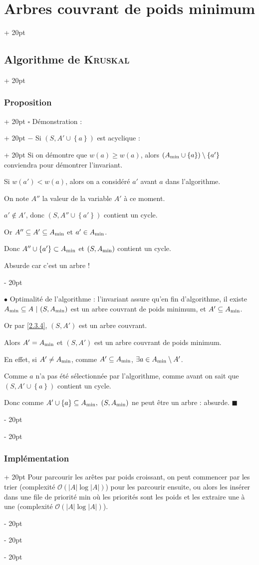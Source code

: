 \documentclass[a4paper, 12pt, twoside]{article}
\newcommand{\set}[1]{\left\{ #1 \right\}}
\newcommand{\abs}[1]{\left\lvert #1 \right\rvert}
\renewcommand{\ge}{\geqslant}
\newcommand{\ind}[1][20pt]{\advance\leftskip + #1}
\newcommand{\deind}[1][20pt]{\advance\leftskip - #1}
\newenvironment{indt}[2][20pt]{#2 \par \ind[#1]}{\par \deind} %
\newenvironment{proof}[1][{Démonstration :}]{\begin{indt}{$\square$ #1}}{$\blacksquare$ \end{indt}}
\begin{document}
\begin{indt}{\section{Arbres couvrant de poids minimum}}
\begin{indt}{\subsection{Algorithme de \textsc{Kruskal}}}
\begin{indt}{\subsubsection{Proposition}}
\begin{proof}
\begin{indt}{$-$ Si $(S, A' \cup \set a)$ est acyclique :}
                        Si on démontre que $w(a) \ge w(a)$, alors $(A_{\rm min} \cup \set a) \setminus \set{a'}$ conviendra pour démontrer l'invariant.

                        Si $w(a') < w(a)$, alors on a considéré $a'$ avant $a$ dans l'algorithme.

                        On note $A''$ la valeur de la variable $A'$ à ce moment.

                        $a' \notin A'$, donc $(S, A'' \cup \set {a'})$ contient un cycle.

                        Or $A'' \subseteq A' \subseteq A_{\rm min}$ et $a' \in A_{\rm min}$.

                        Donc $A'' \cup \set {a'} \subset A_{\rm min}$ et $(S, A_{\rm min})$ contient un cycle.

                        Absurde car c'est un arbre !
                    \end{indt}

                    \vspace{12pt}
                    
                    $\bullet$ Optimalité de l'algorithme : l'invariant assure qu'en fin d'algorithme, il existe $A_{\rm min} \subseteq A\ |\ (S, A_{\rm min})$ est un arbre couvrant de poids minimum, et $A' \subseteq A_{\rm min}$.

                    Or par \ref{2.3.4}, $(S, A')$ est un arbre couvrant.

                    Alors $A' = A_{\rm min}$ et $(S, A')$ est un arbre couvrant de poids minimum.

                    En effet, si $A' \neq A_{\rm min}$, comme $A' \subseteq A_{\rm min}$, $\exists a \in A_{\rm min} \setminus A'$.

                    Comme $a$ n'a pas été sélectionnée par l'algorithme, comme avant on sait que $(S, A' \cup \set a)$ contient un cycle.

                    Donc comme $A' \cup \set a \subseteq A_{\rm min},\ (S, A_{\rm min})$ ne peut être un arbre : absurde.
                \end{proof}
            \end{indt}

            \begin{indt}{\subsubsection{Implémentation}}
                Pour parcourir les arêtes par poids croissant, on peut commencer par les trier (complexité $\mathcal O(\abs A \log \abs A)$) pour les parcourir ensuite, ou alors les insérer dans une file de priorité min où les priorités sont les poids et les extraire une à une (complexité $\mathcal O(\abs A \log \abs A)$).


\end{indt}
\end{indt}
\end{indt}
\end{document}
